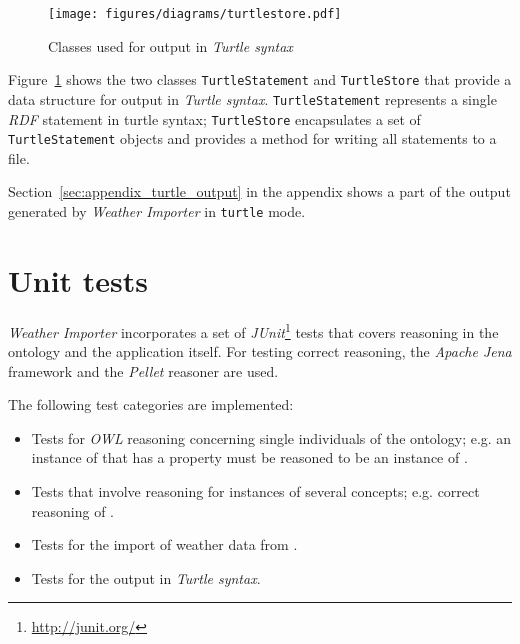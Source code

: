 \begin{figure}
\centering
\texttt{[image: figures/diagrams/turtlestore.pdf]}
\caption{Classes used for output in \emph{Turtle syntax}}
\label{fig:importer_turtlestore}
\end{figure}

Figure~\ref{fig:importer_turtlestore} shows the two classes \texttt{TurtleStatement} and \texttt{TurtleStore} that provide a data structure for output in \emph{Turtle syntax}. \texttt{TurtleStatement} represents a single \emph{RDF} statement in turtle syntax; \texttt{TurtleStore} encapsulates a set of \texttt{TurtleStatement} objects and provides a method for writing all statements to a file.

Section~\ref{sec:appendix_turtle_output} in the appendix shows a part of the output generated by \emph{Weather Importer} in \texttt{turtle} mode.

\section{Unit tests}
\label{sec:importer_tests}

\emph{Weather Importer} incorporates a set of \emph{JUnit}\footnote{\href{http://junit.org/}{http://junit.org/}} tests that covers reasoning in the \thinkhomeweather ontology and the application itself. For testing correct reasoning, the \emph{Apache Jena} framework and the \emph{Pellet} reasoner are used.

The following test categories are implemented:
\begin{itemize}
  \item Tests for \emph{OWL} reasoning concerning single individuals of the ontology; e.g. an instance of  that has a  property must be reasoned to be an instance of .
  \item Tests that involve reasoning for instances of several concepts; e.g. correct reasoning of .
  \item Tests for the import of weather data from \yrno.
  \item Tests for the output in \emph{Turtle syntax}.
\end{itemize}

\begin{comment}
The following parts of the application are not covered by unit tests:

\begin{itemize}
  \item bla
  \item blubb
  \item foo
  \item bar
\end{itemize}
\end{comment}
